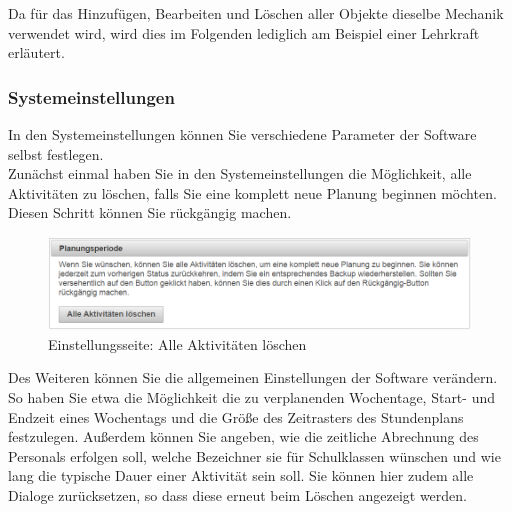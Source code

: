 \documentclass[fontsize=12pt]{scrartcl}
\begin{document}
Da für das Hinzufügen, Bearbeiten und Löschen aller Objekte dieselbe Mechanik verwendet wird, wird dies im Folgenden lediglich am Beispiel einer Lehrkraft erläutert.

\subsubsection{Systemeinstellungen}
In den Systemeinstellungen können Sie verschiedene Parameter der Software selbst festlegen.\\

Zunächst einmal haben Sie in den Systemeinstellungen die Möglichkeit, alle Aktivitäten zu löschen, falls Sie eine komplett neue Planung beginnen möchten. Diesen Schritt können Sie rückgängig machen. 

\begin{figure}[H]
\includegraphics[width=\textwidth]{images/systemSettings1.png}
\caption{Einstellungsseite: Alle Aktivitäten löschen}
\end{figure}

Des Weiteren können Sie die allgemeinen Einstellungen der Software verändern. So haben Sie etwa die Möglichkeit die zu verplanenden Wochentage, Start- und Endzeit eines Wochentags und die Größe des Zeitrasters des Stundenplans festzulegen. Außerdem können Sie angeben, wie die zeitliche Abrechnung des Personals erfolgen soll, welche Bezeichner sie für Schulklassen wünschen und wie lang die typische Dauer einer Aktivität sein soll. Sie können hier zudem alle Dialoge zurücksetzen, so dass diese erneut beim Löschen angezeigt werden. \\

\end{document}
